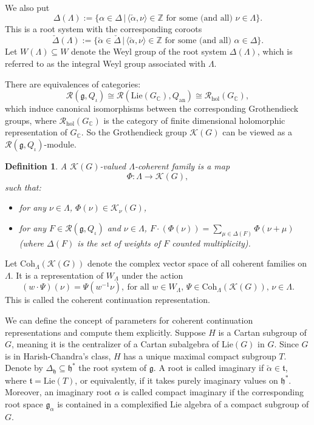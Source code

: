 \documentclass[12pt, a4paper]{amsart}
\numberwithin{equation}{section}
\newtheorem{defn}[thm]{Definition}
\newcommand{\BC}{{\mathbb {C}}}
\newcommand{\BZ}{{\mathbb {Z}}}
\newcommand{\CK}{{\mathcal {K}}}
\newcommand{\CR}{{\mathcal {R}}}
\newcommand{\fg}{\mathfrak{g}}
\newcommand{\fh}{\mathfrak{h}}
\newcommand{\ft}{\mathfrak{t}}
\newcommand{\set}[2]{\{#1\,|\,#2\}}
\begin{document}
We also put 
\begin{equation}
    \Delta(\Lambda) := \set{\alpha \in \Delta}{\textrm{$\langle \check{\alpha} , \nu \rangle \in \BZ$ for some (and all) $\nu \in \Lambda$}}.
\end{equation}
This is a root system with the corresponding coroots 
\begin{equation}
    \check{\Delta}(\Lambda) := \set{\check{\alpha} \in \check{\Delta}}{\textrm{$\langle \check{\alpha}, \nu \rangle \in \BZ$ for some (and all) $\alpha \in \Delta$}}.
\end{equation}
Let $W(\Lambda) \subseteq W$ denote the Weyl group of the root system $\Delta(\Lambda)$, which is referred to as the integral Weyl group associated with $\Lambda$.

There are equivalences of categories:
\begin{equation}
   \CR(\fg, Q_{\iota}) \cong \CR(\mathrm{Lie}(G_\BC),Q_{\mathrm{an}}) \cong \CR_{\mathrm{hol}}(G_{\BC}),
\end{equation}
which induce canonical isomorphisms between the corresponding Grothendieck groups, where $\CR_{\mathrm{hol}}(G_{\BC})$ is the category of finite dimensional holomorphic representation of $G_{\BC}$. So the Grothendieck group $\CK(G)$ can be viewed as a $\CR(\fg, Q_{\iota})$-module.
\begin{defn}
   A $\CK(G)$-valued $\Lambda$-coherent family is a map
   $$\Phi: \Lambda \to \CK(G),$$
   such that:
   \begin{itemize}
      \item for any $\nu \in \Lambda$, $\Phi(\nu) \in \CK_{\nu}(G)$,
      \item for any $F \in \CR(\fg, Q_{\iota})$ and $\nu \in \Lambda$, $F \cdot (\Phi(\nu)) = \sum_{\mu \in \Delta(F)} \Phi(\nu + \mu)$ (where $\Delta(F)$ is the set of weights of $F$ counted multiplicity).
   \end{itemize}
\end{defn}

Let $\mathrm{Coh}_{\Lambda}(\CK(G))$ denote the complex vector space of all coherent families on $\Lambda$. It is a representation of $W_{\Lambda}$ under the action
$$(w \cdot \Psi)(\nu) = \Psi(w^{-1}\nu), \ \textrm{for all $w \in W_{\Lambda}$, $\Psi \in \mathrm{Coh}_{\Lambda}(\CK(G))$, $\nu \in \Lambda$.}$$
This is called the coherent continuation representation.

We can define the concept of parameters for coherent continuation representations and compute them explicitly.
Suppose $H$ is a Cartan subgroup of $G$, meaning it is the centralizer of a Cartan subalgebra of $\mathrm{Lie}(G)$ in $G$. Since $G$ is in Harish-Chandra's class, $H$ has a unique maximal compact subgroup $T$. Denote by $\Delta_{\fh} \subseteq \fh^*$ the root system of $\fg$. A root is called imaginary if $\check{\alpha} \in \ft$, where $\ft = \mathrm{Lie}(T)$, or equivalently, if it takes purely imaginary values on $\fh^*$. Moreover, an imaginary root $\alpha$ is called compact imaginary if the corresponding root space $\fg_{\alpha}$ is contained in a complexified Lie algebra of a compact subgroup of $G$.
\end{document}
